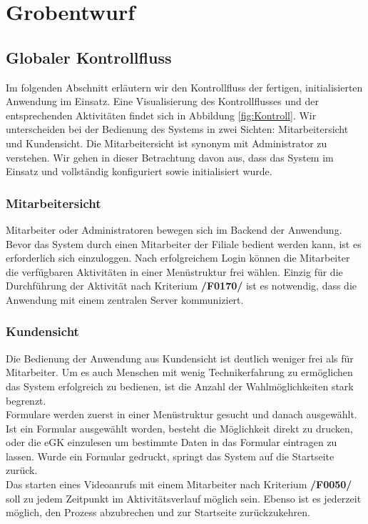 \section{Grobentwurf}
\subsection {Globaler Kontrollfluss}

Im folgenden Abschnitt erläutern wir den Kontrollfluss der fertigen, initialisierten Anwendung im Einsatz. Eine Visualisierung des Kontrollflusses und der entsprechenden Aktivitäten findet sich in Abbildung \ref{fig:Kontroll}. Wir unterscheiden bei der Bedienung des Systems in zwei Sichten: Mitarbeitersicht und Kundensicht. Die Mitarbeitersicht ist synonym mit Administrator zu verstehen. Wir gehen in dieser Betrachtung davon aus, dass das System im Einsatz und vollständig konfiguriert sowie initialisiert wurde.

\subsubsection{Mitarbeitersicht}
Mitarbeiter oder Administratoren bewegen sich im Backend der Anwendung. Bevor das System durch einen Mitarbeiter der Filiale bedient werden kann, ist es erforderlich sich einzuloggen. Nach erfolgreichem Login können die Mitarbeiter die verfügbaren Aktivitäten in einer Menüstruktur frei wählen. Einzig für die Durchführung der Aktivität nach Kriterium \textbf{/F0170/} ist es notwendig, dass die Anwendung mit einem zentralen Server kommuniziert.

\subsubsection{Kundensicht}
Die Bedienung der Anwendung aus Kundensicht ist deutlich weniger frei als für Mitarbeiter. Um es auch Menschen mit wenig Technikerfahrung zu ermöglichen das System erfolgreich zu bedienen, ist die Anzahl der Wahlmöglichkeiten stark begrenzt.\\
\noindent Formulare werden zuerst in einer Menüstruktur gesucht und danach ausgewählt. Ist ein Formular ausgewählt worden, besteht die Möglichkeit direkt zu drucken, oder die eGK einzulesen um bestimmte Daten in das Formular eintragen zu lassen. Wurde ein Formular gedruckt, springt das System auf die Startseite zurück.\\
\noindent Das starten eines Videoanrufs mit einem Mitarbeiter nach Kriterium \textbf{/F0050/} soll zu jedem Zeitpunkt im Aktivitätsverlauf möglich sein. Ebenso ist es jederzeit möglich, den Prozess abzubrechen und zur Startseite zurückzukehren.

